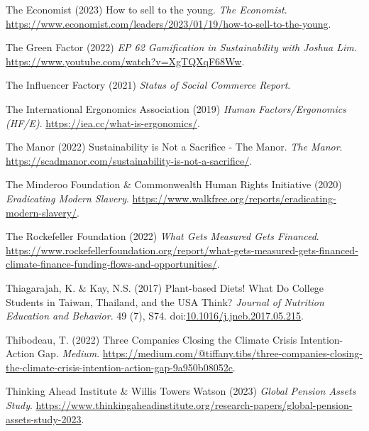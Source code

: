 \documentclass[
  letterpaper,
  DIV=11,
  numbers=noendperiod]{scrartcl}
\newlength{\cslhangindent}
\newenvironment{CSLReferences}[2] %
 {\begin{list}{}{%
  \setlength{\itemindent}{0pt}
  \setlength{\leftmargin}{0pt}
  \setlength{\parsep}{0pt}
  \ifodd #1
   \setlength{\leftmargin}{\cslhangindent}
   \setlength{\itemindent}{-1\cslhangindent}
  \fi
  \setlength{\itemsep}{#2\baselineskip}}}
 {\end{list}}
\begin{document}
\begin{CSLReferences}{0}{1}
The Economist (2023) How to sell to the young. \emph{The Economist}.
\url{https://www.economist.com/leaders/2023/01/19/how-to-sell-to-the-young}.

The Green Factor (2022) \emph{{EP} 62 {Gamification} in {Sustainability}
with {Joshua Lim}}. \url{https://www.youtube.com/watch?v=XgTQXqF68Ww}.

The Influencer Factory (2021) \emph{Status of {Social Commerce Report}}.

The International Ergonomics Association (2019) \emph{Human
{Factors}/{Ergonomics} ({HF}/{E})}.
\url{https://iea.cc/what-is-ergonomics/}.

The Manor (2022) Sustainability is {Not} a {Sacrifice} - {The Manor}.
\emph{The Manor}.
\url{https://scadmanor.com/sustainability-is-not-a-sacrifice/}.

The Minderoo Foundation \& Commonwealth Human Rights Initiative (2020)
\emph{Eradicating {Modern Slavery}}.
\url{https://www.walkfree.org/reports/eradicating-modern-slavery/}.

The Rockefeller Foundation (2022) \emph{What {Gets Measured Gets
Financed}}.
\url{https://www.rockefellerfoundation.org/report/what-gets-measured-gets-financed-climate-finance-funding-flows-and-opportunities/}.

Thiagarajah, K. \& Kay, N.S. (2017) Plant-based {Diets}! {What Do
College Students} in {Taiwan}, {Thailand}, and the {USA Think}?
\emph{Journal of Nutrition Education and Behavior}. 49 (7), S74.
doi:\href{https://doi.org/10.1016/j.jneb.2017.05.215}{10.1016/j.jneb.2017.05.215}.

Thibodeau, T. (2022) Three {Companies Closing} the {Climate Crisis
Intention-Action Gap}. \emph{Medium}.
\url{https://medium.com/@tiffany.tibs/three-companies-closing-the-climate-crisis-intention-action-gap-9a950b08052c}.

Thinking Ahead Institute \& Willis Towers Watson (2023) \emph{Global
{Pension Assets Study}}.
\url{https://www.thinkingaheadinstitute.org/research-papers/global-pension-assets-study-2023}.


\end{CSLReferences}
\end{document}
